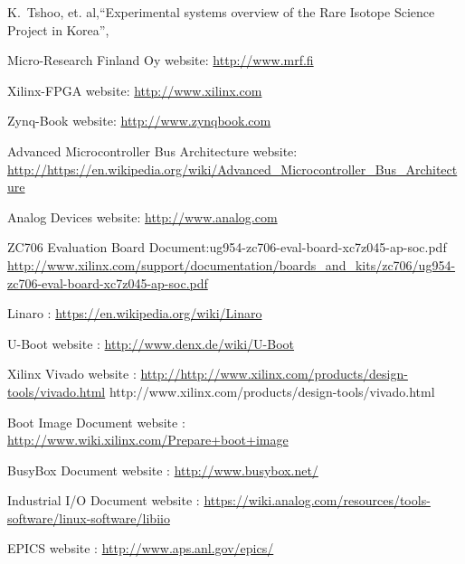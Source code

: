 \documentclass[a4paper,
              ]{jacow}
\begin{document}
\begin{thebibliography}{9}   %

 K.~Tshoo,{ et. al},``Experimental systems overview of the Rare Isotope Science Project in Korea'',

	Micro-Research Finland Oy website:
	\url{http://www.mrf.fi}%

Xilinx-FPGA website:
\url{http://www.xilinx.com}

Zynq-Book website:
\url{http://www.zynqbook.com}


Advanced Microcontroller Bus Architecture website:
\url{http://https://en.wikipedia.org/wiki/Advanced_Microcontroller_Bus_Architecture}


Analog Devices website:
\url{http://www.analog.com}

ZC706 Evaluation Board Document:ug954-zc706-eval-board-xc7z045-ap-soc.pdf
\url{http://www.xilinx.com/support/documentation/boards_and_kits/zc706/ug954-zc706-eval-board-xc7z045-ap-soc.pdf}

Linaro :
\url{https://en.wikipedia.org/wiki/Linaro}

U-Boot website :
\url{http://www.denx.de/wiki/U-Boot}


Xilinx Vivado website :
\url{http://http://www.xilinx.com/products/design-tools/vivado.html}
http://www.xilinx.com/products/design-tools/vivado.html

Boot Image Document website :
\url{http://www.wiki.xilinx.com/Prepare+boot+image}

BusyBox Document website :
\url{http://www.busybox.net/}

Industrial I/O Document website :
\url{https://wiki.analog.com/resources/tools-software/linux-software/libiio}

EPICS website :
\url{http://www.aps.anl.gov/epics/}


\end{thebibliography}

\fi
\end{document}
